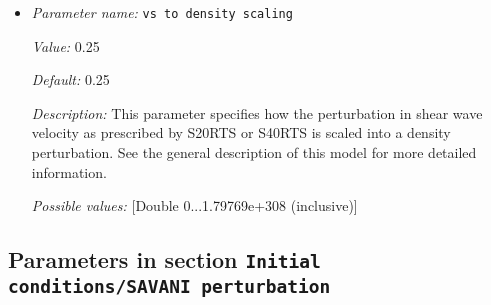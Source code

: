 \begin{itemize}
{\it Default:} 2e-5


{\it Description:} The value of the thermal expansion coefficient $\beta$. Units: $1/K$.


{\it Possible values:} [Double 0...1.79769e+308 (inclusive)]
\item {\it Parameter name:} {\tt vs to density scaling}
\label{parameters:Initial conditions/S40RTS perturbation/vs to density scaling}


{\it Value:} 0.25


{\it Default:} 0.25


{\it Description:} This parameter specifies how the perturbation in shear wave velocity as prescribed by S20RTS or S40RTS is scaled into a density perturbation. See the general description of this model for more detailed information.


{\it Possible values:} [Double 0...1.79769e+308 (inclusive)]
\end{itemize}

\subsection{Parameters in section \tt Initial conditions/SAVANI perturbation}
\label{parameters:Initial_20conditions/SAVANI_20perturbation}

